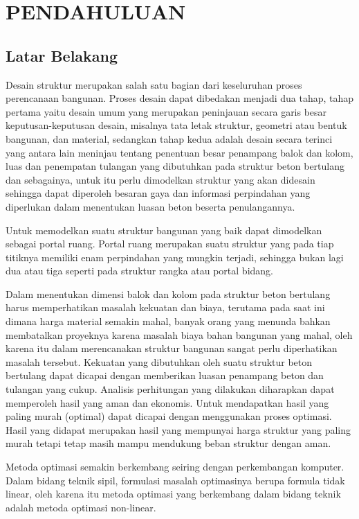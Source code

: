 \chapter{PENDAHULUAN}
\label{bab:pendahuluan}

\section{Latar Belakang}

Desain struktur merupakan salah satu bagian dari keseluruhan proses
perencanaan bangunan. Proses desain dapat dibedakan menjadi dua tahap, tahap
pertama yaitu desain umum yang merupakan peninjauan secara garis besar
keputusan-keputusan desain, misalnya tata letak struktur, geometri atau
bentuk bangunan, dan material, sedangkan tahap kedua adalah desain secara
terinci yang antara lain meninjau tentang penentuan besar penampang balok
dan kolom, luas dan penempatan tulangan yang dibutuhkan pada struktur beton
bertulang dan sebagainya, untuk itu perlu dimodelkan struktur yang akan
didesain sehingga dapat diperoleh besaran gaya dan informasi perpindahan
yang diperlukan dalam menentukan luasan beton beserta penulangannya.

Untuk memodelkan suatu struktur bangunan yang baik dapat dimodelkan sebagai
portal ruang. Portal ruang merupakan suatu struktur yang pada tiap titiknya
memiliki enam perpindahan yang mungkin terjadi, sehingga bukan lagi dua atau
tiga seperti pada struktur rangka atau portal bidang.

Dalam menentukan dimensi balok dan kolom pada struktur beton bertulang harus
memperhatikan masalah kekuatan dan biaya, terutama pada saat ini dimana
harga material semakin mahal, banyak orang yang menunda bahkan membatalkan
proyeknya karena masalah biaya bahan bangunan yang mahal, oleh karena itu
dalam merencanakan struktur bangunan sangat perlu diperhatikan masalah
tersebut. Kekuatan yang dibutuhkan oleh suatu struktur beton bertulang dapat
dicapai dengan memberikan luasan penampang beton dan tulangan yang cukup.
Analisis perhitungan yang dilakukan diharapkan dapat memperoleh hasil yang
aman dan ekonomis. Untuk mendapatkan hasil yang paling murah (optimal) dapat
dicapai dengan menggunakan proses optimasi. Hasil yang didapat merupakan
hasil yang mempunyai harga struktur yang paling murah tetapi tetap masih
mampu mendukung beban struktur dengan aman.

Metoda optimasi semakin berkembang seiring dengan perkembangan komputer.
Dalam bidang teknik sipil, formulasi masalah optimasinya berupa formula
tidak linear, oleh karena itu metoda optimasi yang berkembang dalam bidang
teknik adalah metoda optimasi non-linear.

